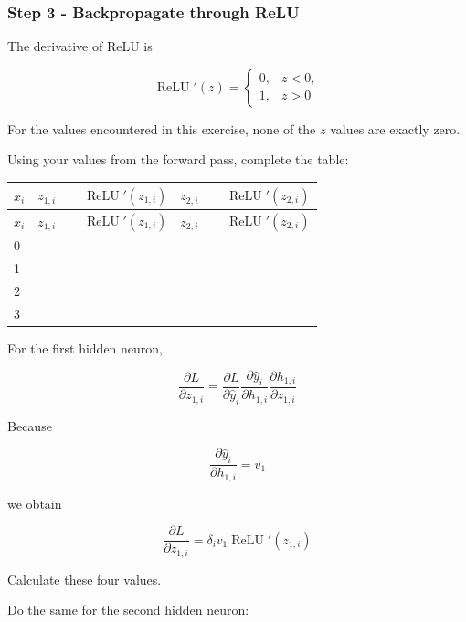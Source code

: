 \documentclass{course_sheet}
\begin{document}
\subsubsection*{Step 3 - Backpropagate through ReLU}
The derivative of ReLU is

\[
\operatorname{ReLU}'(z)=
\begin{cases}
0, & z<0,\\1, & z>0
\end{cases}
\]

For the values encountered in this exercise, none of the $z$ values are exactly zero.

Using your values from the forward pass, complete the table:

\begingroup
\small
\setlength{\tabcolsep}{4pt}
\begin{longtable}{l|l|l|l|l}
$x_i$ & $z_{1,i}$ & $\operatorname{ReLU}'(z_{1,i})$ & $z_{2,i}$ & $\operatorname{ReLU}'(z_{2,i})$ \\[1.5pt]
\hline
\endfirsthead
$x_i$ & $z_{1,i}$ & $\operatorname{ReLU}'(z_{1,i})$ & $z_{2,i}$ & $\operatorname{ReLU}'(z_{2,i})$ \\[1.5pt]
\hline
\endhead
\rule{0pt}{2.4ex}0 &  $\phantom{-0.00}$ &  $\phantom{-0.00}$ &  $\phantom{-0.00}$ &  $\phantom{-0.00}$ \\[3pt]
\rule{0pt}{2.4ex}1 &  $\phantom{-0.00}$ &  $\phantom{-0.00}$ &  $\phantom{-0.00}$ &  $\phantom{-0.00}$ \\[3pt]
\rule{0pt}{2.4ex}2 &  $\phantom{-0.00}$ &  $\phantom{-0.00}$ &  $\phantom{-0.00}$ &  $\phantom{-0.00}$ \\[3pt]
\rule{0pt}{2.4ex}3 &  $\phantom{-0.00}$ &  $\phantom{-0.00}$ &  $\phantom{-0.00}$ &  $\phantom{-0.00}$ \\[3pt]
\end{longtable}
\endgroup
For the first hidden neuron,

\[
\frac{\partial L}{\partial z_{1,i}}=\frac{\partial L}{\partial\hat y_i}\frac{\partial\hat y_i}{\partial h_{1,i}}\frac{\partial h_{1,i}}{\partial z_{1,i}}
\]

Because

\[
\frac{\partial\hat y_i}{\partial h_{1,i}}=v_1
\]

we obtain

\[
\frac{\partial L}{\partial z_{1,i}}=\delta_i v_1\operatorname{ReLU}'(z_{1,i})
\]

Calculate these four values.

Do the same for the second hidden neuron:
\end{document}
